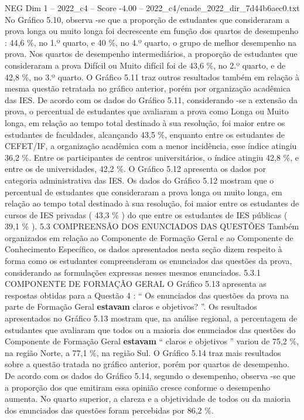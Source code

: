 \begin{textsample}{NEG Dim 1 – 2022\_c4 – Score -4.00 – 2022\_c4/enade\_2022\_dir\_7d44b6aec0.txt}
No Gráfico 5.10, observa -se que a proporção de estudantes que consideraram a prova longa ou muito longa foi decrescente em função dos quartos de desempenho : 44,6 \%, no 1.º quarto, e 40 \%, no 4.º quarto, o grupo de melhor desempenho na prova.
Nos quartos de desempenho intermediários, a proporção de estudantes que consideraram a prova Difícil ou Muito difícil foi de 43,6 \%, no 2.º quarto, e de 42,8 \%, no 3.º quarto.
O Gráfico 5.11 traz outros resultados também em relação à mesma questão retratada no gráfico anterior, porém por organização acadêmica das IES.
De acordo com os dados do Gráfico 5.11, considerando -se a extensão da prova, o percentual de estudantes que avaliaram a prova como Longa ou Muito longa, em relação ao tempo total destinado à sua resolução, foi maior entre os estudantes de faculdades, alcançando 43,5 \%, enquanto entre os estudantes de CEFET/IF, a organização acadêmica com a menor incidência, esse índice atingiu 36,2 \%.
Entre os participantes de centros universitários, o índice atingiu 42,8 \%, e entre os de universidades, 42,2 \%.
O Gráfico 5.12 apresenta os dados por categoria administrativa das IES.
Os dados do Gráfico 5.12 mostram que o percentual de estudantes que consideraram a prova longa ou muito longa, em relação ao tempo total destinado à sua resolução, foi maior entre os estudantes de cursos de IES privadas ( 43,3 \% ) do que entre os estudantes de IES públicas ( 39,1 \% ). 5.3 COMPREENSÃO DOS ENUNCIADOS DAS QUESTÕES Também organizados em relação ao Componente de Formação Geral e ao Componente de Conhecimento Específico, os dados apresentados nesta seção dizem respeito à forma como os estudantes compreenderam os enunciados das questões da prova, considerando as formulações expressas nesses mesmos enunciados. 5.3.1 COMPONENTE DE FORMAÇÃO GERAL O Gráfico 5.13 apresenta as respostas obtidas para a Questão 4 : “ Os enunciados das questões da prova na parte de Formação Geral \textbf{estavam} claros e objetivos? ”.
Os resultados apresentados no Gráfico 5.13 mostram que, na análise regional, a percentagem de estudantes que avaliaram que todos ou a maioria dos enunciados das questões do Componente de Formação Geral \textbf{estavam} “ claros e objetivos ” variou de 75,2 \%, na região Norte, a 77,1 \%, na região Sul.
O Gráfico 5.14 traz mais resultados sobre a questão tratada no gráfico anterior, porém por quartos de desempenho.
De acordo com os dados do Gráfico 5.14, segundo o desempenho, observa -se que a proporção dos que emitiram essa opinião cresce conforme o desempenho aumenta.
No quarto superior, a clareza e a objetividade de todos ou da maioria dos enunciados das questões foram percebidas por 86,2 \%.

\end{textsample}

